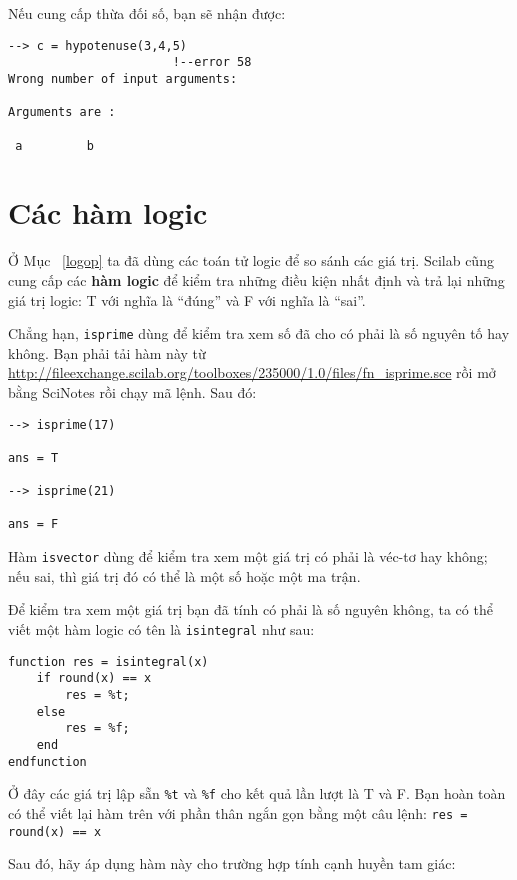 \documentclass[12pt]{book}
\begin{document}
Nếu cung cấp thừa đối số, bạn sẽ nhận được:

\begin{verbatim}
--> c = hypotenuse(3,4,5)
                       !--error 58 
Wrong number of input arguments:

Arguments are :

 a         b       
\end{verbatim}



\section{Các hàm logic}

Ở Mục~ \ref{logop} ta đã dùng các toán tử logic để so sánh các 
giá trị. Scilab cũng cung cấp các {\bf hàm logic} để kiểm tra những
điều kiện nhất định và trả lại những giá trị logic: T với nghĩa là 
``đúng'' và F với nghĩa là ``sai''.

Chẳng hạn, {\tt isprime} dùng để kiểm tra xem số đã cho có
phải là số nguyên tố hay không. Bạn phải tải hàm này từ 
\url{http://fileexchange.scilab.org/toolboxes/235000/1.0/files/fn_isprime.sce} rồi 
mở bằng SciNotes rồi chạy mã lệnh. Sau đó: 

\begin{verbatim}
--> isprime(17)

ans = T

--> isprime(21)

ans = F
\end{verbatim}

Hàm {\tt isvector} dùng để kiểm tra xem một
giá trị có phải là véc-tơ hay không; nếu sai, thì giá trị đó
có thể là một số hoặc một ma trận.

Để kiểm tra xem một giá trị bạn đã tính có phải là số nguyên không,
ta có thể viết một hàm logic có tên là \texttt{isintegral} như sau:

\begin{verbatim}
function res = isintegral(x)
    if round(x) == x
        res = %t;
    else
        res = %f;
    end
endfunction
\end{verbatim}

Ở đây các giá trị lập sẵn \texttt{\%t} và \texttt{\%f} cho kết quả lần lượt
là T và F. Bạn hoàn toàn có thể viết lại hàm trên với phần thân ngắn gọn
bằng một câu lệnh: \texttt{res = round(x) == x}

Sau đó, hãy áp dụng hàm này cho trường hợp tính cạnh huyền tam giác:
\end{document}

